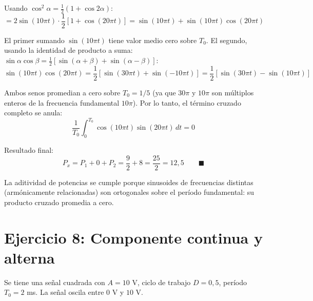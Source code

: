 \documentclass[10pt,a4paper]{article}
\begin{document}
\begin{enumerate}[label=\textbf{\alph*)}]
		Usando $\cos^2\alpha = \frac{1}{2}(1+\cos 2\alpha)$:
		\[
		= 2\sin(10\pi t)\cdot\frac{1}{2}[1 + \cos(20\pi t)] = \sin(10\pi t) + \sin(10\pi t)\cos(20\pi t)
		\]
		
		El primer sumando $\sin(10\pi t)$ tiene valor medio cero sobre $T_0$. El segundo, usando la identidad de producto a suma: $\sin\alpha\cos\beta = \frac{1}{2}[\sin(\alpha+\beta)+\sin(\alpha-\beta)]$:
		\[
		\sin(10\pi t)\cos(20\pi t) = \frac{1}{2}[\sin(30\pi t) + \sin(-10\pi t)] = \frac{1}{2}[\sin(30\pi t) - \sin(10\pi t)]
		\]
		
		Ambos senos promedian a cero sobre $T_0 = 1/5$ (ya que $30\pi$ y $10\pi$ son múltiplos enteros de la frecuencia fundamental $10\pi$). Por lo tanto, el término cruzado completo se anula:
		\[
		\frac{1}{T_0}\int_0^{T_0} \cos(10\pi t)\sin(20\pi t)\,dt = 0
		\]
		
		Resultado final:
		\[
		P_x = P_1 + 0 + P_2 = \frac{9}{2} + 8 = \frac{25}{2} = 12{,}5\qquad \blacksquare
		\]
		
		La aditividad de potencias se cumple porque sinusoides de frecuencias distintas (armónicamente relacionadas) son ortogonales sobre el período fundamental: su producto cruzado promedia a cero.
	\end{enumerate}

	\section*{Ejercicio 8: Componente continua y alterna}
	
	Se tiene una señal cuadrada con $A=10$ V, ciclo de trabajo $D=0{,}5$, período $T_0=2$ ms. La señal oscila entre $0$ V y $10$ V.
	
\end{document}
